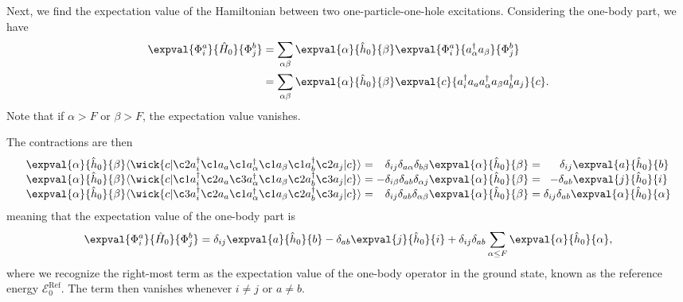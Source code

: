 \newpage

Next, we find the expectation value of the Hamiltonian between two one-particle-one-hole excitations.
Considering the one-body part, we have
\begin{align*}
    \expval{\Phi_i^a}{\hat{H}_0}{\Phi_j^b} &= \sum_{\alpha\beta} \expval{\alpha}{\hat{h}_0}{\beta} \expval{\Phi_i^a}{a_\alpha^\dagger a_\beta}{\Phi_j^b} \\
    &= \sum_{\alpha\beta} \expval{\alpha}{\hat{h}_0}{\beta} \expval{c}{a_i^\dagger a_a  a_\alpha^\dagger a_\beta a_b^\dagger a_j}{c}.
\end{align*}
Note that if $\alpha > F$ or $\beta > F$, the expectation value vanishes.

The contractions are then
\begin{equation*}
    \arraycolsep=1.4pt
    \begin{array}{rlrcr}
        \expval{\alpha}{\hat{h}_0}{\beta}
        \langle
        \wick{
            c
            \vert
            \c2 a_i^\dagger \c1 a_a \c1 a_\alpha^\dagger \c1 a_\beta \c1 a_b^\dagger \c2 a_j
            \vert
            c
        }
        \rangle
        &=& \delta_{ij} \delta_{a \alpha} \delta_{b \beta} \expval{\alpha}{\hat{h}_0}{\beta}
        &=& \delta_{ij} \expval{a}{\hat{h}_0}{b} \,
        \\
        \expval{\alpha}{\hat{h}_0}{\beta}
        \langle
        \wick{
            c
            \vert
            \c1 a_i^\dagger \c2 a_a \c3 a_\alpha^\dagger \c1 a_\beta \c2 a_b^\dagger \c3 a_j
            \vert
            c
        }
        \rangle
        &= &- \delta_{i \beta} \delta_{a b} \delta_{\alpha j} \expval{\alpha}{\hat{h}_0}{\beta}
        &=& -\delta_{ab} \expval{j}{\hat{h}_0}{i} \;  \\
        \expval{\alpha}{\hat{h}_0}{\beta}
        \langle
        \wick{
            c
            \vert
            \c3 a_i^\dagger \c2 a_a \c1 a_\alpha^\dagger \c1 a_\beta \c2 a_b^\dagger \c3 a_j
            \vert
            c
        }
        \rangle
        &=& \delta_{i j} \delta_{a b} \delta_{\alpha \beta} \expval{\alpha}{\hat{h}_0}{\beta}
        &=& \delta_{i j} \delta_{a b} \expval{\alpha}{\hat{h}_0}{\alpha} \\
    \end{array}
\end{equation*}
meaning that the expectation value of the one-body part is
\begin{equation*}
    \expval{\Phi_i^a}{\hat{H}_0}{\Phi_j^b} = \delta_{ij} \expval{a}{\hat{h}_0}{b} - \delta_{ab} \expval{j}{\hat{h}_0}{i} + \delta_{ij} \delta_{ab} \sum_{\alpha \leq F} \expval{\alpha}{\hat{h}_0}{\alpha},
\end{equation*}
where we recognize the right-most term as the expectation value of the one-body operator in the ground state, known as the reference energy $\mathcal{E}_0^{\text{Ref}}$.
The term then vanishes whenever $i \neq j$ or $a \neq b$.


